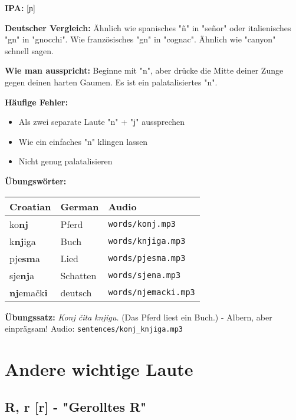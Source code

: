 \begin{tcolorbox}[colback=lightgreen!30, colframe=green!60!black, title=\textbf{Nj, nj}]

\textbf{IPA:} [ɲ]

\textbf{Deutscher Vergleich:}
Ähnlich wie spanisches "ñ" in "señor" oder italienisches "gn" in "gnocchi". Wie französisches "gn" in "cognac". Ähnlich wie "canyon" schnell sagen.

\textbf{Wie man ausspricht:}
Beginne mit "n", aber drücke die Mitte deiner Zunge gegen deinen harten Gaumen. Es ist ein palatalisiertes "n".

\textbf{Häufige Fehler:}
\begin{itemize}
    \item Als zwei separate Laute "n" + "j" aussprechen
    \item Wie ein einfaches "n" klingen lassen
    \item Nicht genug palatalisieren
\end{itemize}

\textbf{Übungswörter:}
\begin{tabular}{lll}
\textbf{Croatian} & \textbf{German} & \textbf{Audio} \\
\midrule
ko\textbf{nj} & Pferd & \texttt{words/konj.mp3} \\
k\textbf{nj}iga & Buch & \texttt{words/knjiga.mp3} \\
pje\textbf{sm}a & Lied & \texttt{words/pjesma.mp3} \\
sje\textbf{nj}a & Schatten & \texttt{words/sjena.mp3} \\
\textbf{nj}emačk\textbf{i} & deutsch & \texttt{words/njemacki.mp3} \\
\end{tabular}

\textbf{Übungssatz:}
\textit{Konj čita knjigu.}
(Das Pferd liest ein Buch.) - Albern, aber einprägsam!
Audio: \texttt{sentences/konj\_knjiga.mp3}

\end{tcolorbox}

\section{Andere wichtige Laute}

\subsection{R, r [r] - "Gerolltes R"}

